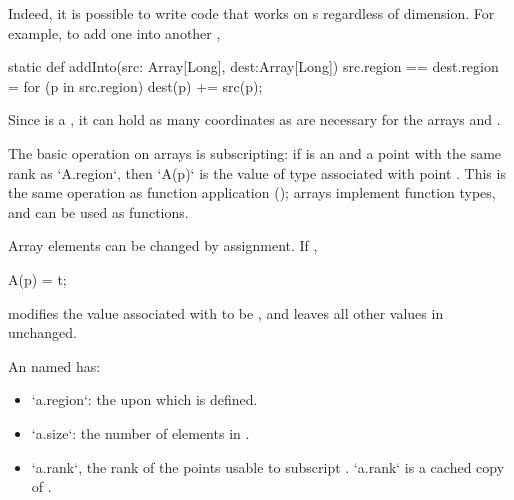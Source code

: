 \begin{ex}Indeed, it is possible to write code that works on s regardless 
of dimension.  For example, to add one   into another
, 
\begin{xten}
static def addInto(src: Array[Long], dest:Array[Long])
  {src.region == dest.region}
  = {
    for (p in src.region) 
       dest(p) += src(p);
  }
\end{xten}
\noindent
Since  is a , it can hold as many coordinates as are
necessary for the arrays  and .
\end{ex}

The basic operation on arrays is subscripting: if  is an 
and  a point with the same rank as \xcd`A.region`, then
\xcd`A(p)`
is the value of type  associated with point .
This is the same operation as function application
(); arrays implement function types, and can be
used as functions.

Array elements can be changed by assignment. If , 
\begin{xten}
A(p) = t;
\end{xten}
modifies the value associated with  to be , and leaves all other
values in  unchanged.

An  named  has: 
\begin{itemize}
\item \xcd`a.region`: the  upon which  is defined.
\item \xcd`a.size`: the number of elements in .
\item \xcd`a.rank`, the rank of the points usable to subscript . 
      \xcd`a.rank` is a cached copy of 
      .
\end{itemize}

